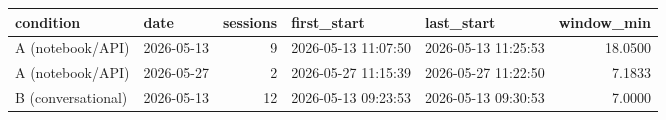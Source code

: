 \begin{tabular}{llrllr}
\toprule
         condition &       date &  sessions &         first\_start &          last\_start &  window\_min \\
\midrule
  A (notebook/API) & 2026-05-13 &         9 & 2026-05-13 11:07:50 & 2026-05-13 11:25:53 &     18.0500 \\
  A (notebook/API) & 2026-05-27 &         2 & 2026-05-27 11:15:39 & 2026-05-27 11:22:50 &      7.1833 \\
B (conversational) & 2026-05-13 &        12 & 2026-05-13 09:23:53 & 2026-05-13 09:30:53 &      7.0000 \\
\bottomrule
\end{tabular}
